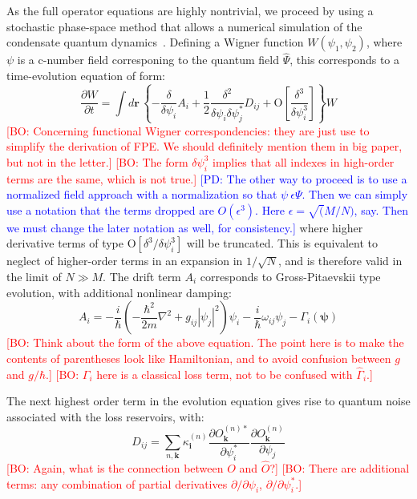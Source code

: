 \documentclass[aps,prl,twocolumn,showpacs,amsmath,amssymb,superscriptaddress]{revtex4-1}
\newcommand{\bogdansremark}[1]{\textcolor{red}{{[}BO: #1{]}}}
\newcommand{\petersremark}[1]{\textcolor{blue}{{[}PD: #1{]}}}
\begin{document}
As the full operator equations are highly nontrivial,
we proceed by using a stochastic phase-space method
that allows a numerical simulation of the condensate quantum dynamics~\cite{Drummond1993, Steel1998}.
Defining a Wigner function $W\left(\psi_{1},\psi_{2}\right)$,
where $\psi$ is a c-number field corresponing to the quantum field $\hat{\Psi}$,
this corresponds to a time-evolution equation of form:
\begin{equation}
	\frac{\partial W}{\partial t} = \int d\mathbf{r}\,\left\{
		-\frac{\delta}{\delta\psi_{i}} A_{i} +
		\frac{1}{2} \frac{\delta^{2}}{\delta\psi_{i} \delta\psi_{j}^{*}}D_{ij} +
		\mbox{O} \left[ \frac{\delta^{3}}{\delta\psi_{i}^{3}} \right]
	\right\} W
\end{equation}
	\bogdansremark{Concerning functional Wigner correspondencies:
	they are just use to simplify the derivation of FPE.
	We should definitely mention them in big paper, but not in the letter.}
	\bogdansremark{The form $\delta\psi_{i}^{3}$ implies that all indexes in high-order terms
	are the same, which is not true.}
	\petersremark{The other way to proceed is to use a normalized field approach
	with a normalization so that $\psi ~ \epsilon\Psi$.
	Then we can simply use a notation that the terms dropped are $O(\epsilon^3)$.
	Here $\epsilon = \sqrt(M/N)$, say.
	Then we must change the later notation as well, for consistency.}
where higher derivative terms of type $\mbox{O}\left[\delta^{3}/\delta\psi_{i}^{3}\right]$
will be truncated.
This is equivalent to neglect of higher-order terms in an expansion in $1/\sqrt{N}$,
and is therefore valid in the limit of $N \gg M$.
The drift term $A_{i}$ corresponds to Gross-Pitaevskii type evolution,
with additional nonlinear damping:
\begin{equation}
	A_{i} = -\frac{i}{\hbar} \left(
	 	-\frac{\hbar^2}{2m} \nabla^{2} + g_{ij} \left| \psi_{j} \right|^{2}
	\right) \psi_{i} -
	\frac{i}{\hbar} \omega_{ij} \psi_{j} -
	\Gamma_{i} \left( \boldsymbol{\psi} \right)
\end{equation}
	\bogdansremark{Think about the form of the above equation.
	The point here is to make the contents of parentheses look like Hamiltonian,
	and to avoid confusion between $g$ and $g / \hbar$.}
	\bogdansremark{$\Gamma_{i}$ here is a classical loss term,
	not to be confused with $\hat{\Gamma}_{i}$.}

The next highest order term in the evolution equation gives rise to
quantum noise associated with the loss reservoirs,
with:
\begin{equation}
	D_{ij} = \sum_{n,\mathbf{k}} \kappa_{\mathbf{i}}^{(n)}
	\frac{\partial O_{\mathbf{k}}^{(n)*}}{\partial\psi_{i}^{*}}
	\frac{\partial O_{\mathbf{k}}^{(n)}}{\partial\psi_{j}}
\end{equation}
	\bogdansremark{Again, what is the connection between $O$ and $\hat{O}$?}
	\bogdansremark{There are additional terms: any combination of partial derivatives
	$\partial/\partial\psi_{i}$, $\partial/\partial\psi_{i}^*$.}
\end{document}

